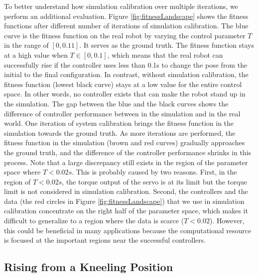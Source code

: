   To better understand how  simulation calibration  over multiple iterations, we perform an additional evaluation. Figure \ref{fig:fitnessLandscape} shows the fitness functions after different number of iterations of simulation calibration. The blue curve is the fitness function on the real robot by varying the control parameter $T$ in the range of $[0, 0.11]$. It serves as the ground truth. The fitness function stays at a high value when $T\in[0, 0.1]$, which means that the real robot can successfully rise if the controller uses less than 0.1s to change the pose from the initial to the final configuration. In contrast, without simulation calibration, the fitness function (lowest black curve) stays at a low value for the entire control space. In other words, no controller exists that can make the robot stand up in the simulation. The gap between the blue and the black curves shows the difference of controller performance between in the simulation and in the real world. One iteration of system calibration brings the fitness function in the simulation towards the ground truth. As more iterations are performed, the fitness function in the simulation (brown and red curves) gradually approaches the ground truth, and the difference of the controller performance shrinks in this process. Note that a large discrepancy still exists in the region of the parameter space where $T<0.02s$. This is probably caused by two reasons. First, in the region of $T<0.02s$, the torque output of the servo is at its limit but the torque limit is not considered in simulation calibration. Second, the controllers and the data (the red circles in Figure \ref{fig:fitnessLandscape}) that we use in simulation calibration concentrate on the right half of the parameter space, which makes it difficult to generalize to a region where the data is scarce ($T<0.02$). However, this could be beneficial in many applications because the computational resource is focused at the important regions near the successful controllers.

\subsection{Rising from a Kneeling Position}

